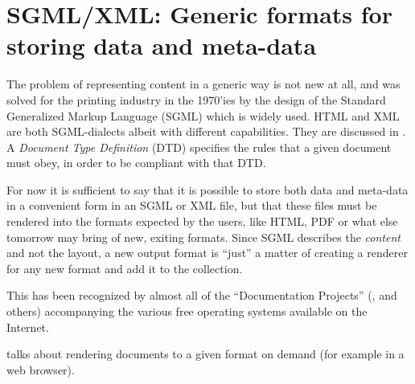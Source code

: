 \section{SGML/XML:  Generic formats for storing data and meta-data}
\label{sec:sgml-and-xml-generic-formats}

The problem of representing content in a generic way is not
new at all, and was solved for the printing industry in the
1970'ies by the design of the Standard Generalized Markup
Language (SGML) which is widely used.  HTML and XML are both
SGML-dialects albeit with different capabilities.  They are
discussed in .  A
\textit{Document Type Definition} (DTD) specifies the rules
that a given document must obey, in order to be compliant
with that DTD.

For now it is sufficient to say that it is possible to store both data
and meta-data in a convenient form in an SGML or XML file, but that
these files must be rendered into the formats expected by the users,
like HTML, PDF or what else tomorrow may bring of new, exiting
formats.  Since SGML describes the \textit{content} and not the
layout, a new output format is ``just'' a matter of creating a
renderer for any new format and add it to the collection.

This has been recognized by almost all of the ``Documentation
Projects'' (,  and others) accompanying the various
free operating systems available on the Internet.


 talks about rendering documents
to a given format on demand (for example in a web browser).







